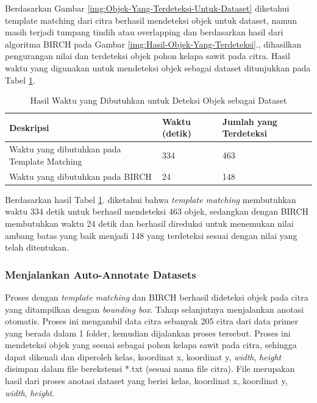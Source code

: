 Berdasarkan Gambar \ref{img:Objek-Yang-Terdeteksi-Untuk-Dataset} diketahui template matching dari citra berhasil mendeteksi objek untuk dataset, namun masih terjadi tumpang tindih atau overlapping dan berdasarkan hasil dari algoritma BIRCH pada Gambar \ref{img:Hasil-Objek-Yang-Terdeteksi}., dihasilkan pengurangan nilai dan terdeteksi objek pohon kelapa sawit pada citra. Hasil waktu yang digunakan untuk mendeteksi objek sebagai dataset ditunjukkan pada Tabel \ref{tbl:Hasil-Waktu-Yang-Dibutuhkan-Untuk-Deteksi-Objek-Sebagai-Dataset}.

\begin{singlespace}
	\begin{table}[H]
		\centering
		\caption{Hasil Waktu yang Dibutuhkan untuk Deteksi Objek sebagai Dataset}
		\label{tbl:Hasil-Waktu-Yang-Dibutuhkan-Untuk-Deteksi-Objek-Sebagai-Dataset}
		\begin{tabular}{|m{5cm}|m{3cm}|m{4cm}|}
			\hline
			\rowcolor[HTML]{D9D9D9} 
			Deskripsi                                    & Waktu (detik) & Jumlah yang Terdeteksi \\ \hline
			Waktu yang dibutuhkan pada Template Matching & 334              & 463                    \\ \hline
			Waktu yang dibutuhkan pada BIRCH             & 24               & 148                    \\ \hline
		\end{tabular}
	\end{table}
\end{singlespace}

Berdasarkan hasil Tabel \ref{tbl:Hasil-Waktu-Yang-Dibutuhkan-Untuk-Deteksi-Objek-Sebagai-Dataset}. diketahui bahwa \textit{template matching} membutuhkan waktu 334 detik untuk berhasil mendeteksi 463 objek, sedangkan dengan BIRCH membutuhkan waktu 24 detik dan berhasil direduksi untuk menemukan nilai ambang batas yang baik menjadi 148 yang terdeteksi sesuai dengan nilai yang telah ditentukan. 

\subsubsection{Menjalankan Auto-Annotate Datasets}
\hspace{1,2cm}
Proses dengan \textit{template matching} dan BIRCH berhasil dideteksi objek pada citra yang ditampilkan dengan \textit{bounding box}. Tahap selanjutnya menjalankan anotasi otomatis. Proses ini mengambil data citra sebanyak 205 citra dari data primer yang berada dalam 1 folder, kemudian dijalankan proses tersebut. Proses ini mendeteksi objek yang sesuai sebagai pohon kelapa sawit pada citra, sehingga dapat dikenali dan diperoleh kelas, koordinat x, koordinat y, \textit{width}, \textit{height} disimpan dalam file berekstensi *.txt (sesuai nama file citra). File merupakan hasil dari proses anotasi dataset yang berisi kelas, koordinat x, koordinat y, \textit{width}, \textit{height}.

